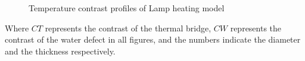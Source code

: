\documentclass{tQRT2e}
\begin{document}
\begin{figure}
	\hspace{-15pt}
	\caption{Temperature contrast profiles of Lamp heating model}
	\label{sim_fig_ht}
\end{figure}
Where $ CT $ represents the contrast of the thermal bridge, $ CW $ represents the contrast of the water defect in all figures, and the numbers indicate the diameter and the thickness respectively. 
\end{document}
